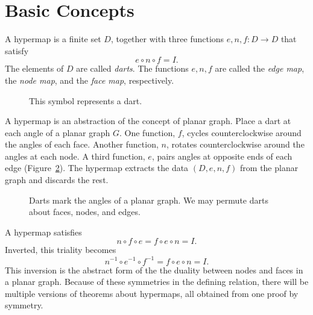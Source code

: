 


\section{Basic Concepts}



\begin{definition}  A hypermap is a finite set $D$, together with
three functions $e,n,f:D\to D$ that satisfy
    $$e\circ n\circ f = I.$$
The elements of $D$ are called {\it darts}.  The functions $e,n,f$
are called the {\it edge map}, the {\it node map}, and the {\it
face map}, respectively.
\end{definition}


\begin{figure}[htb]
  \centering
  \caption{This symbol represents a dart.}
  \label{fig:dart}
\end{figure}

\begin{remark}\label{rem:hypermap} A hypermap is an abstraction of
the concept of 
planar graph.  Place a dart at each angle of a planar graph $G$.
One function, $f$, 
cycles counterclockwise around the angles of each face.  
Another function, $n$, 
rotates counterclockwise around the angles at each
node.  A third function, $e$, pairs angles at opposite ends of
each edge  (Figure~\ref{fig:hypermap_ex}).   The hypermap extracts
the data $(D,e,n,f)$ from the planar graph and discards the rest.
\end{remark}

\begin{figure}[htb]
  \centering
  \caption{Darts mark the angles of a planar graph.  We may
  permute darts about faces, nodes, and edges.}
  \label{fig:hypermap_ex}
\end{figure}

A hypermap satisfies 
  \begin{equation}\label{eqn:triality}
  n\circ f\circ e = f\circ e\circ n = I.
  \end{equation}
Inverted, this triality becomes
   $$
   n^{-1} \circ e^{-1} \circ f^{-1} = f \circ e \circ n = I.
   $$
This inversion
is the abstract form of the
the duality between nodes and faces in a planar graph.  
Because of
these symmetries in the defining relation, 
there will be multiple versions of 
theorems about hypermaps,
all obtained from one proof by symmetry.

